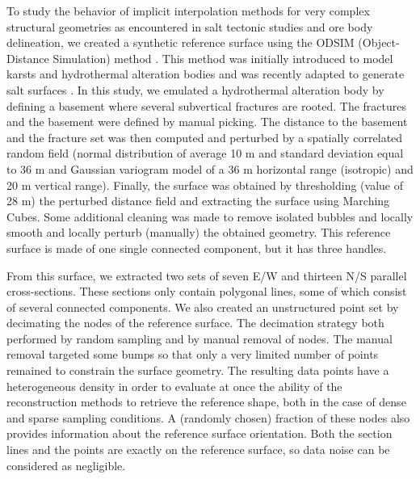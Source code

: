 \documentclass[final]{ring20}
\begin{document}
To study the behavior of implicit interpolation methods for very complex structural geometries as encountered in salt tectonic studies and ore body delineation, we created a synthetic reference surface using the ODSIM (Object-Distance Simulation) method \citep{Henrion2010MG}. This method was initially introduced to model karsts and hydrothermal alteration bodies \citep{Henrion2008PEIGC,Rongier2014G} and was recently adapted to generate salt surfaces \citep{Clausolles20188ECE2}. In this study, we emulated a hydrothermal alteration body by defining a basement where several subvertical fractures are rooted. The fractures and the basement were defined by manual picking. The distance to the basement and the fracture set was then computed and perturbed by a spatially correlated random field (normal distribution of average 10 m and standard deviation equal to 36 m and Gaussian variogram model of a 36 m horizontal range (isotropic) and 20 m vertical range). Finally, the surface was obtained 
by thresholding (value of 28 m) the perturbed distance field and extracting the surface using Marching Cubes. Some additional cleaning was made to remove isolated bubbles and locally smooth and locally perturb (manually) the obtained geometry. This reference surface is made of one single connected component, but it has three handles. 

From this surface, we extracted two sets of seven E/W and thirteen N/S parallel cross-sections. These sections only contain polygonal lines, some of which consist of several connected components. We also created an unstructured point set by decimating the nodes of the reference surface. The decimation strategy both performed by random sampling and by manual removal of nodes. The manual removal targeted some bumps so that only a very limited number of points remained to constrain the surface geometry. The resulting data points have a heterogeneous density in order to evaluate at once the ability of the reconstruction methods to retrieve the reference shape, both in the case of dense and sparse sampling conditions. A (randomly chosen) fraction of these nodes also provides information about the reference surface orientation. Both the section lines and the points are exactly on the reference surface, so data noise can be considered as negligible. 

\end{document}
